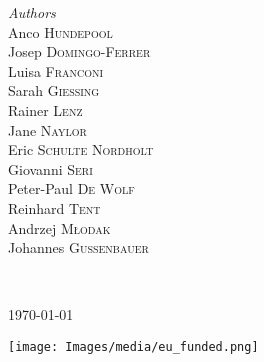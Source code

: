 	\begin{minipage}{0.4\textwidth}
		\begin{flushleft}
			\large
			\textit{Authors}\\
			Anco \textsc{Hundepool}\\
    		Josep \textsc{Domingo-Ferrer}\\
    		Luisa \textsc{Franconi}\\
    		Sarah \textsc{Giessing}\\
    		Rainer \textsc{Lenz}\\
    		Jane \textsc{Naylor}\\
    		Eric \textsc{Schulte Nordholt}\\
    		Giovanni \textsc{Seri}\\
    		Peter-Paul \textsc{De Wolf}\\
    		Reinhard \textsc{Tent}\\
    		Andrzej \textsc{Młodak}\\
    		Johannes \textsc{Gussenbauer}
		\end{flushleft}
	\end{minipage}
	~
	\begin{minipage}{0.4\textwidth}
		\begin{flushright}
			\large
		\end{flushright}
	\end{minipage}
	
	
	
	\vfill\vfill\vfill %
	
	{\large\today} %
	
	
	\vfill\vfill
	\texttt{[image: Images/media/eu\_funded.png]}\\[1cm] %
	 
